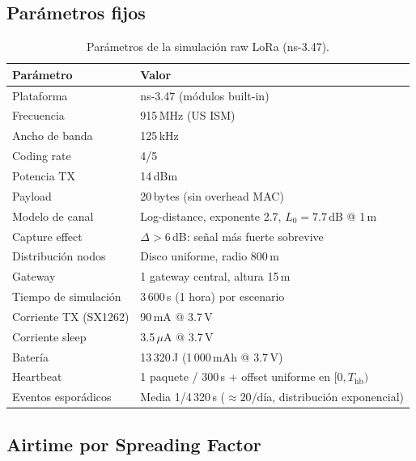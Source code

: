 \documentclass[12pt,letterpaper]{article}
\begin{document}
\subsection{Parámetros fijos}

\begin{table}[H]
\centering
\caption{Parámetros de la simulación raw LoRa (ns-3.47).}
\label{tab:sim_params}
\begin{tabular}{ll}
\toprule
\textbf{Parámetro} & \textbf{Valor} \\
\midrule
Plataforma             & ns-3.47 (módulos built-in) \\
Frecuencia             & 915\,MHz (US ISM) \\
Ancho de banda         & 125\,kHz \\
Coding rate            & 4/5 \\
Potencia TX            & 14\,dBm \\
Payload                & 20\,bytes (sin overhead MAC) \\
Modelo de canal        & Log-distance, exponente 2.7, $L_0 = 7.7$\,dB @ 1\,m \\
Capture effect         & $\Delta > 6$\,dB: señal más fuerte sobrevive \\
Distribución nodos     & Disco uniforme, radio 800\,m \\
Gateway                & 1 gateway central, altura 15\,m \\
Tiempo de simulación   & 3\,600\,s (1 hora) por escenario \\
Corriente TX (SX1262)  & 90\,mA @ 3.7\,V \\
Corriente sleep        & 3.5\,$\mu$A @ 3.7\,V \\
Batería                & 13\,320\,J  (1\,000\,mAh @ 3.7\,V) \\
Heartbeat              & 1 paquete / 300\,s + offset uniforme en $[0, T_\text{hb})$ \\
Eventos esporádicos    & Media 1/4\,320\,s ($\approx 20$/día, distribución exponencial) \\
\bottomrule
\end{tabular}
\end{table}

\subsection{Airtime por Spreading Factor}
\end{document}
